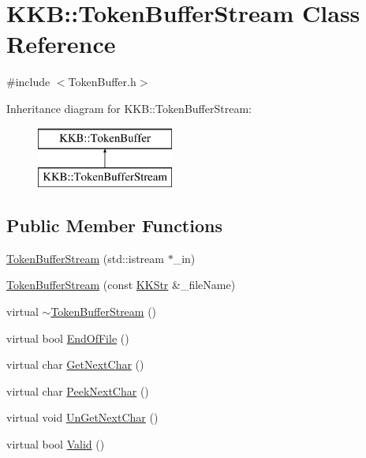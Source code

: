 \hypertarget{class_k_k_b_1_1_token_buffer_stream}{}\section{K\+KB\+:\+:Token\+Buffer\+Stream Class Reference}
\label{class_k_k_b_1_1_token_buffer_stream}


{\ttfamily \#include $<$Token\+Buffer.\+h$>$}

Inheritance diagram for K\+KB\+:\+:Token\+Buffer\+Stream\+:\begin{figure}[H]
\begin{center}
\leavevmode
\includegraphics[height=2.000000cm]{class_k_k_b_1_1_token_buffer_stream}
\end{center}
\end{figure}
\subsection*{Public Member Functions}
\begin{DoxyCompactItemize}
\item 
\hyperlink{class_k_k_b_1_1_token_buffer_stream_a7d4953a65b5c8c59b9f6594c8d8ca4de}{Token\+Buffer\+Stream} (std\+::istream $\ast$\+\_\+in)
\item 
\hyperlink{class_k_k_b_1_1_token_buffer_stream_a4c8f2348703ddc893cbbced71c5a89e1}{Token\+Buffer\+Stream} (const \hyperlink{class_k_k_b_1_1_k_k_str}{K\+K\+Str} \&\+\_\+file\+Name)
\item 
virtual \hyperlink{class_k_k_b_1_1_token_buffer_stream_a42fce0e2e8ac75fec48b746f0ebb6299}{$\sim$\+Token\+Buffer\+Stream} ()
\item 
virtual bool \hyperlink{class_k_k_b_1_1_token_buffer_stream_a5c8e2826a9a7dca64a459c031eaa84c1}{End\+Of\+File} ()
\item 
virtual char \hyperlink{class_k_k_b_1_1_token_buffer_stream_a01008b895e43af10face7888209fc6db}{Get\+Next\+Char} ()
\item 
virtual char \hyperlink{class_k_k_b_1_1_token_buffer_stream_a15a7c84a9da05d11585197918b31ee53}{Peek\+Next\+Char} ()
\item 
virtual void \hyperlink{class_k_k_b_1_1_token_buffer_stream_ac978567a7936432a555858c54d2f79d4}{Un\+Get\+Next\+Char} ()
\item 
virtual bool \hyperlink{class_k_k_b_1_1_token_buffer_stream_ab4ae9cad1348037fa6b75969c6091eb7}{Valid} ()
\end{DoxyCompactItemize}


